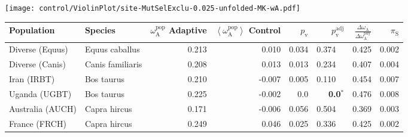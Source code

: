 \begin{center}
\texttt{[image: control/ViolinPlot/site-MutSelExclu-0.025-unfolded-MK-wA.pdf]} 
\begin{adjustbox}{width = 1\textwidth}
\begin{tabular}{|l|l|r|r|r|r|r|r|}
\toprule
                     Population &              Species & \specialcell{$\omega_{\mathrm{A}}^{\mathrm{pop}}$ \\ Adaptive} & \specialcell{$\left< \omega_{\mathrm{A}}^{\mathrm{pop}} \right>$ \\ Control} & $p_{\mathrm{v}}$ & $p_{\mathrm{v}}^{\mathrm{adj}}$ & $\frac{\Delta\omega_{\mathrm{A}}}{\Delta\omega_{\mathrm{A}}^{\mathrm{phy}}}$ & $\pi_{\textrm{S}}$ \\
\midrule
                Diverse (Equus) &       Equus caballus &                                              0.213 &                                              0.010 &            0.034 &                         0.374~~ &                                              0.425 &              0.002 \\
                Diverse (Canis) &     Canis familiaris &                                              0.208 &                                              0.013 &            0.013 &                         0.234~~ &                                              0.407 &              0.004 \\
                    Iran (IRBT) &           Bos taurus &                                              0.210 &                                             -0.007 &            0.005 &                         0.110~~ &                                              0.454 &              0.007 \\
                  Uganda (UGBT) &           Bos taurus &                                              0.225 &                                             -0.002 &              0.0 &                    \textbf{0.0}$\bm{^*}$ &                                              0.476 &              0.008 \\
               Australia (AUCH) &         Capra hircus &                                              0.171 &                                             -0.006 &            0.056 &                         0.504~~ &                                              0.369 &              0.003 \\
                  France (FRCH) &         Capra hircus &                                              0.249 &                                              0.046 &            0.025 &                         0.336~~ &                                              0.425 &              0.002 \\

\end{tabular}
\end{adjustbox}
\end{center}
